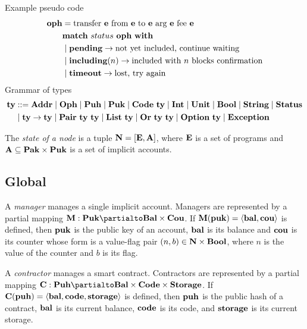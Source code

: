 \documentclass[a4paper]{llncs}
\begin{document}
Example pseudo code
\begin{align*}
  \OPH &=  \TRANSFER[\EXPR]\EXPR\EXPR\EXPR\EXPR \\
       & \MATCH\ {status\ \OPH}\ \WITH \\
       & \mid \STATUSPENDING \to \textrm{not yet included, continue waiting} \\
       & \mid \STATUSINCLUDING (n) \to \textrm{included with $n$
         blocks confirmation}\\
       & \mid \STATUSTIMEOUT \to \textrm{lost, try again}
\end{align*}
Grammar of types
\begin{align*}
  \TYPE & ::= \TADDR \mid \TOPH \mid \TPUH \mid \TPUK \mid \TCODE\ \TYPE \mid
          \TINT \mid \TUNIT \mid \TBOOL \mid \TSTRING \mid \TSTATUS \\
  & \mid \TYPE\to\TYPE \mid \TPAIR\ \TYPE\ \TYPE \mid \TLIST\ \TYPE
    \mid \TSUM\ \TYPE\ \TYPE \mid \TOPTION\ \TYPE \mid \TEXCEPTION
\end{align*}

\begin{definition}%
  The \emph{state of a node} is a tuple
  $\NODE = [ \EXPRS, \ACCOUNTS
  ]$, where $\EXPRS$ is a
  set of programs and $\ACCOUNTS \subseteq \TPAK \times \TPUK$  is a set of
  implicit accounts.
\end{definition}


\subsection{Global}
\label{sec:global}



\begin{definition}%
A \emph{manager} manages a single implicit account. Managers are
represented by a partial mapping $\MANAGERS : \TPUK \partialto \TBAL
\times \TCOU$. If $\MANAGERS (\PUK) = \Angle{\BAL, \COU}$ is defined, then  $\PUK$ is the
public key of an account, $\BAL$ is its
balance and $\COU$ is its counter whose form is a value-flag pair
$(n,b) \in \Nat\times\TBOOL$, where $n$ is the value of the counter
and ${b}$ is its flag.   
\end{definition}

\begin{definition}%
  A \emph{contractor} manages a smart contract. Contractors are
  represented by a partial mapping $\CONTRACTORS : \TPUH \partialto
  \TBAL \times \TCODE \times \TSTORAGE$. If $\CONTRACTORS (\PUH) = \langle
  \BAL, \CODE, \STORAGE \rangle $ is defined, then $\PUH$ is the
  public hash of a contract, $\BAL$ is its current balance, $\CODE$ is its
  code, and $\STORAGE$ is its current storage.
\end{definition}
\end{document}

